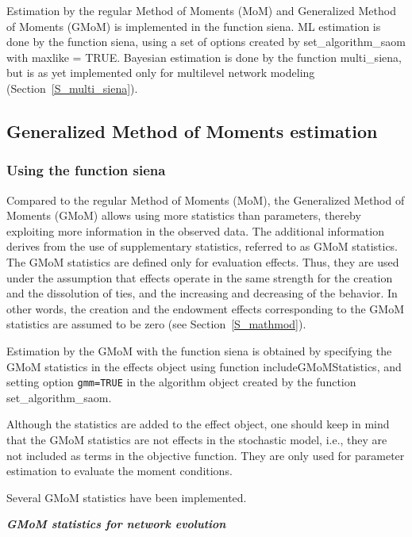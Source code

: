 \documentclass[a4paper,fleqn,11pt]{article}
\newcommand{\+}{\, + \,}
\newcommand{\sfn}[1]{\textsf{#1}}
\begin{document}
Estimation by the regular Method of Moments (MoM)
and Generalized Method of Moments (GMoM)
is implemented in the function \sfn{siena}.
ML estimation is done by the function \sfn{siena}, using a set of options
created by \sfn{set\_algorithm\_saom} with \sfn{maxlike = TRUE}.
Bayesian estimation is done by the function \sfn{multi\_siena},
but is as yet implemented only for multilevel network modeling
(Section~\ref{S_multi_siena}).


\subsection{Generalized Method of Moments estimation}
\label{S_GMoM}

\subsubsection{Using the function \sfn{siena}}
\label{S_GMoM_siena}


Compared to the regular Method of Moments (MoM), the Generalized Method of
Moments (GMoM) allows using more statistics than parameters,
thereby exploiting more information in the observed data.
The additional information derives from the use of supplementary statistics,
referred to as GMoM statistics. The GMoM statistics are defined only for
evaluation effects. Thus, they are used under the assumption that
effects operate in the same strength for the creation and the dissolution of ties,
and the increasing and decreasing of the behavior. In other words,
the creation and the endowment effects
corresponding to the GMoM statistics are assumed to be zero
(see Section~\ref{S_mathmod}).
\medskip

Estimation by the GMoM with the function \sfn{siena} is obtained
by specifying the GMoM statistics in the effects object using
function \sfn{includeGMoMStatistics},
and setting option \texttt{gmm=TRUE}
in the algorithm object created by the function \sfn{set\_algorithm\_saom}.

Although the statistics are added to the effect object,
one should keep in mind that the GMoM statistics are not effects
in the stochastic model, i.e., they are not
included as terms in the objective function.
They are only used for parameter estimation to evaluate the moment conditions.

Several GMoM statistics have been implemented.
\bigskip

\noindent
\textbf{\emph{GMoM statistics for network evolution }}
\medskip
\end{document}
